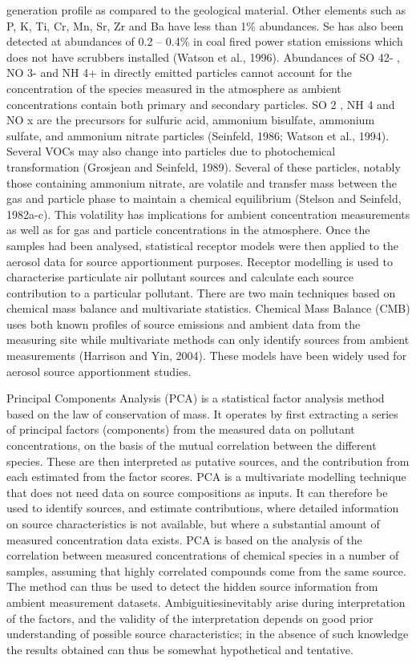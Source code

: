 \documentclass{nwureport}
\begin{document}
generation profile as compared to the geological material. Other elements such as P, K, Ti, Cr, Mn, Sr, Zr and
Ba have less than 1\% abundances. Se has also been detected at abundances of 0.2 – 0.4\% in coal fired
power station emissions which does not have scrubbers installed (Watson et al., 1996). Abundances of
SO 42- , NO 3- and NH 4+ in directly emitted particles cannot account for the concentration of the species
measured in the atmosphere as ambient concentrations contain both primary and secondary particles. SO 2 ,
NH 4 and NO x are the precursors for sulfuric acid, ammonium bisulfate, ammonium sulfate, and ammonium
nitrate particles (Seinfeld, 1986; Watson et al., 1994). Several VOCs may also change into particles due to
photochemical transformation (Grosjean and Seinfeld, 1989). Several of these particles, notably those
containing ammonium nitrate, are volatile and transfer mass between the gas and particle phase to maintain
a chemical equilibrium (Stelson and Seinfeld, 1982a-c). This volatility has implications for ambient
concentration measurements as well as for gas and particle concentrations in the atmosphere.
Once the samples had been analysed, statistical receptor models were then applied to the aerosol data for
source apportionment purposes. Receptor modelling is used to characterise particulate air pollutant sources
and calculate each source contribution to a particular pollutant. There are two main techniques based on
chemical mass balance and multivariate statistics. Chemical Mass Balance (CMB) uses both known profiles
of source emissions and ambient data from the measuring site while multivariate methods can only identify
sources from ambient measurements (Harrison and Yin, 2004). These models have been widely used for
aerosol source apportionment studies.

Principal Components Analysis (PCA) is a statistical factor analysis method based on the law of conservation
of mass. It operates by first extracting a series of principal factors (components) from the measured data on
pollutant concentrations, on the basis of the mutual correlation between the different species. These are
then interpreted as putative sources, and the contribution from each estimated from the factor scores.
PCA is a multivariate modelling technique that does not need data on source compositions as inputs. It can
therefore be used to identify sources, and estimate contributions, where detailed information on source
characteristics is not available, but where a substantial amount of measured concentration data exists.
PCA is based on the analysis of the correlation between measured concentrations of chemical species in a
number of samples, assuming that highly correlated compounds come from the same source. The method
can thus be used to detect the hidden source information from ambient measurement datasets. Ambiguitiesinevitably arise during interpretation of the factors, and the validity of the interpretation depends on good
prior understanding of possible source characteristics; in the absence of such knowledge the results
obtained can thus be somewhat hypothetical and tentative.
\end{document}
